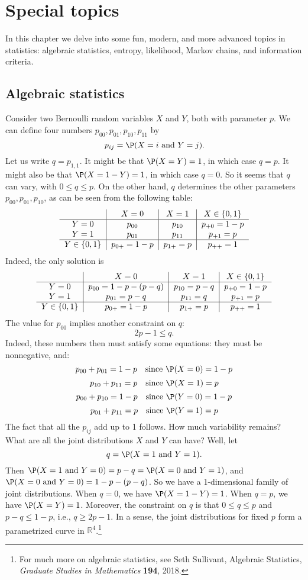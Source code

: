 \chapter{Special topics}\label{chMarkov}
In this chapter we delve into some fun, modern, and more advanced topics in statistics: algebraic statistics, entropy, likelihood, Markov chains, and information criteria.
\label{hmc}

\section{Algebraic statistics}\label{sec:algebraic}

Consider two Bernoulli random variables $X$ and $Y$, both with parameter $p$.
We can define four numbers $p_{00}, p_{01}, p_{10}, p_{11}$ by
\[
	p_{ij}=\P(X=i\text{ and }Y=j).
\]
Let us write $q=p_{1,1}$. It might be that $\P(X=Y)=1$, in which case $q=p$.
It might also be that $\P(X=1-Y)=1$, in which case $q=0$. So it seems that $q$ can vary, with $0\le q\le p$.
On the other hand, $q$ determines the other parameters $p_{00}, p_{01}, p_{10}$, as can be seen from the following table:
\[
\begin{tabular}{c|c|c|c}
		& $X=0$		& $X=1$		& $X\in\{0,1\}$\\
\hline
$Y=0$	& $p_{00}$	& $p_{10}$	& $p_{+0}=1-p$	\\
$Y=1$	& $p_{01}$	& $p_{11}$	& $p_{+1}=p$	\\
\hline
$Y\in\{0,1\}$	& $p_{0+}=1-p$	& $p_{1+}=p$	& $p_{++}=1$
\end{tabular}
\]
Indeed, the only solution is
\[
\begin{tabular}{c|c|c|c}
		& $X=0$		& $X=1$		& $X\in\{0,1\}$\\
\hline
$Y=0$	& $p_{00}=1-p-(p-q)$	& $p_{10}=p-q$	& $p_{+0}=1-p$	\\
$Y=1$	& $p_{01}=p-q$	& $p_{11}=q$	& $p_{+1}=p$	\\
\hline
$Y\in\{0,1\}$	& $p_{0+}=1-p$	& $p_{1+}=p$	& $p_{++}=1$
\end{tabular}
\]
The value for $p_{00}$ implies another constraint on $q$:
\[
	2p-1\le q.
\]
Indeed, these numbers then must satisfy some equations: they must be nonnegative, and:
\[
	p_{00}+p_{01}=1-p\quad\text{since $\P(X=0)=1-p$}
\]
\[
	p_{10}+p_{11}=p\quad\text{since $\P(X=1)=p$}
\]
\[
	p_{00}+p_{10}=1-p\quad\text{since $\P(Y=0)=1-p$}
\]
\[
	p_{01}+p_{11}=p\quad\text{since $\P(Y=1)=p$}
\]
The fact that all the $p_{ij}$ add up to 1 follows.
How much variability remains? What are all the joint distributions $X$ and $Y$ can have?
Well, let
\[
	q=\P(X=1\text{ and }Y=1).
\]
Then $\P(X=1\text{ and }Y=0)=p-q=\P(X=0\text{ and }Y=1)$, and $\P(X=0\text{ and }Y=0)=1-p-(p-q)$.
So we have a 1-dimensional family of joint distributions.
When $q=0$, we have $\P(X=1-Y)=1$. When $q=p$, we have $\P(X=Y)=1$.
Moreover, the constraint on $q$ is that $0\le q\le p$ and $p-q\le 1-p$, i.e., $q\ge 2p-1$.
In a sense, the joint distributions for fixed $p$ form a parametrized curve in $\mathbb R^4$.\footnote{For much more on algebraic statistics, see Seth Sullivant, Algebraic Statistics, \emph{Graduate Studies in Mathematics} \textbf{194}, 2018.}


